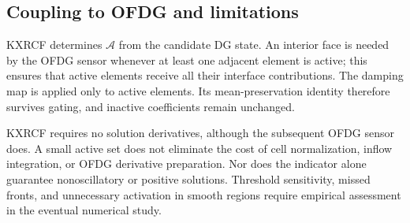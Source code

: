 \subsection{Coupling to OFDG and limitations}
KXRCF determines $\mathcal A$ from the candidate DG state. An interior face is
needed by the OFDG sensor whenever at least one adjacent element is active;
this ensures that active elements receive all their interface contributions.
The damping map is applied only to active elements. Its mean-preservation
identity therefore survives gating, and inactive coefficients remain unchanged.

KXRCF requires no solution derivatives, although the subsequent OFDG sensor
does. A small active set does not eliminate the cost of cell normalization,
inflow integration, or OFDG derivative preparation. Nor does the indicator
alone guarantee nonoscillatory or positive solutions. Threshold sensitivity,
missed fronts, and unnecessary activation in smooth regions require empirical
assessment in the eventual numerical study.

